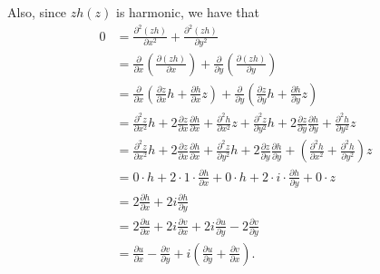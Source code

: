 \documentclass[9pt]{article}
\begin{document}
\begin{enumerate}
      Also, since $zh(z)$ is harmonic, we have that
      \begin{align*}
         0 &= \frac{\partial^2 (zh)}{\partial x^2} +
              \frac{\partial^2 (zh)}{\partial y^2} \\
           &=  \frac{\partial}{\partial x}
               \left(\frac{\partial (zh)}{\partial x}\right) +
               \frac{\partial}{\partial y}
               \left(\frac{\partial (zh)}{\partial y}\right) \\
           &=  \frac{\partial}{\partial x}
               \left(\frac{\partial z}{\partial x}h +
               \frac{\partial h}{\partial x}z\right) +
               \frac{\partial}{\partial y}
               \left(\frac{\partial z}{\partial y}h +
               \frac{\partial h}{\partial y}z\right) \\
           &=  \frac{\partial^2z}{\partial x^2}h +2\frac{\partial z}{\partial x}
               \frac{\partial h}{\partial x} +\frac{\partial^2h}{\partial x^2}z+
               \frac{\partial^2z}{\partial y^2}h+2\frac{\partial z}{\partial y}
               \frac{\partial h}{\partial y}+\frac{\partial^2h}{\partial y^2}z\\
           &=  \frac{\partial^2z}{\partial x^2}h +2\frac{\partial z}{\partial x}
               \frac{\partial h}{\partial x} +
               \frac{\partial^2z}{\partial y^2}h+2\frac{\partial z}{\partial y}
               \frac{\partial h}{\partial y}+
               \left(\frac{\partial^2h}{\partial x^2}+
               \frac{\partial^2h}{\partial y^2}\right)z \\
           &=  0 \cdot h+2\cdot1\cdot
               \frac{\partial h}{\partial x} +
               0 \cdot h+2\cdot i \cdot
               \frac{\partial h}{\partial y}+ 0 \cdot z \\
           &=  2\frac{\partial h}{\partial x} +
               2i\frac{\partial h}{\partial y} \\
           &=  2\frac{\partial u}{\partial x} +2i\frac{\partial v}{\partial x}+
               2i\frac{\partial u}{\partial y}-2\frac{\partial v}{\partial y} \\
           &=  \frac{\partial u}{\partial x}-\frac{\partial v}{\partial y}+
               i\left(\frac{\partial u}{\partial y}+
               \frac{\partial v}{\partial x}\right).               
      \end{align*}
      

\end{enumerate}
\end{document}
